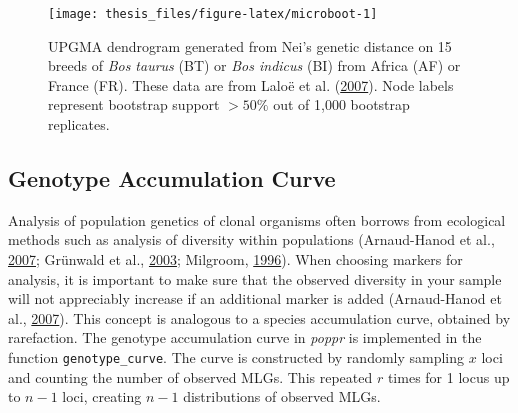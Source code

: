 \documentclass[double,12pt]{beavtex}
\begin{document}
  \begin{Shaded}
  \begin{Highlighting}[]
  \NormalTok{(}\NormalTok{);}
  \NormalTok{(}\NormalTok{, } \NormalTok{);}
  \StringTok{ }\NormalTok{(}
  \StringTok{ }\ErrorTok{~}
  \StringTok{ }
  
  \NormalTok{(}\NormalTok{);}
  \StringTok{ } \NormalTok{, } \NormalTok{);}
  \end{Highlighting}
  \end{Shaded}
  
  \begin{figure}
  
  {\centering \texttt{[image: thesis\_files/figure-latex/microboot-1]} 
  
  }
  
  \caption[UPGMA dendrogram generated from Nei's genetic distance]{UPGMA dendrogram generated from Nei's genetic distance on 15 breeds of
  \emph{Bos taurus} (BT) or \emph{Bos indicus} (BI) from Africa (AF) or
  France (FR). These data are from Laloë et al.
  (\protect\hyperlink{ref-laloe2007consensus}{2007}). Node labels
  represent bootstrap support \(>50\%\) out of 1,000 bootstrap replicates.}\label{fig:microboot}
  \end{figure}
  
  \subsection{Genotype Accumulation
  Curve}\label{genotype-accumulation-curve}
  
  Analysis of population genetics of clonal organisms often borrows from
  ecological methods such as analysis of diversity within populations
  (Arnaud-Hanod et al.,
  \protect\hyperlink{ref-arnaud2007standardizing}{2007}; Grünwald et al.,
  \protect\hyperlink{ref-grunwald2003analysis}{2003}; Milgroom,
  \protect\hyperlink{ref-milgroom1996recombination}{1996}). When choosing
  markers for analysis, it is important to make sure that the observed
  diversity in your sample will not appreciably increase if an additional
  marker is added (Arnaud-Hanod et al.,
  \protect\hyperlink{ref-arnaud2007standardizing}{2007}). This concept is
  analogous to a species accumulation curve, obtained by rarefaction. The
  genotype accumulation curve in \emph{poppr} is implemented in the
  function \texttt{genotype\_curve}. The curve is constructed by randomly
  sampling \(x\) loci and counting the number of observed MLGs. This
  repeated \(r\) times for 1 locus up to \(n-1\) loci, creating \(n-1\)
  distributions of observed MLGs.
  
\end{document}
